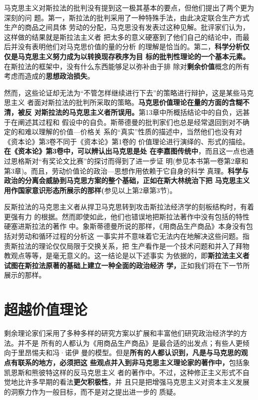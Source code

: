 马克思主义对斯拉法的批判没有提到这一极其基本的要点，但他们提出了两个更为深刻的问
题。第一，斯拉法的批判采用了一种特殊手法，由此决定联合生产方式生产的商品之间具体
劳动的分配，马克思没有发表过这种见解。批评家们认为，这样做的结果就是斯拉法主义者
把太多的意义硬塞到了他们自己的结论中，而最后并没有表明他们对马克思价值的量的分析
的理解是恰当的。第二，\textbf{科学分析仅仅是马克思主义努力成为以转换现存秩序为目
  标的批判性理论的一个基本元素。}在斯拉法的框架中，没有什么东西能够足以弥补由于排
除对\textbf{剩余价值}概念的所有考虑而造成的\textbf{思想政治损失}。

然而，这些论证却无法为“不管怎样继续进行下去”的策略进行辩护，这是某些马克思主义
者面对斯拉法的批判所采取的策略。\textbf{马克思价值理论在量的方面的含糊不清，被反
  对斯拉法的马克思主义者所误用。}第13章中所概括结论中的自负，远甚于在阐述其过程和
假设中的自负。斯蒂德曼的批判家们也总是经常退回到对不确定的和难以理解的价值—价格关
系的“真实”性质的描述中，当然他们也没有对《资本论》第3卷不同于《资本论》第1卷的
价值理论进行演绎的、形式的描绘。\textbf{在《资本论》第3卷中，可以辨认出马克思是处
  在李嘉图传统中}，而且这一点也通过恩格斯对“有奖论文比赛”的探讨而得到了进一步证
明(参见本书第一卷第2章和第3章)。而且，劳动价值论的政治—思想作用依赖于它自身的科学
真理。\textbf{科学与政治的分离会威胁到马克思方案的整个基础，正如在斯大林统治下把
  马克思主义用作国家意识形态所展示的那样(}参见以上第2章第3节)。

反斯拉法的马克思主义者从捍卫马克思转到攻击斯拉法经济学的刻板结构时，有着更强有力
的根据。然而即使如此，他们也错误地把斯拉法著作中没有包括的特性硬塞进斯拉法的著作
中。象斯蒂德曼所说的那样，《用商品生产商品》本身没有包括对劳动和循环过程的分析这
一事实并不意味着它无法内在地解决这些问题。指责斯拉法的理论仅仅局限于交换关系，把
生产看作是一个技术问题和并入了拜物教观点等等，是毫无意义的。这一结论是以下述事实
为依据的，即\textbf{斯拉法主义者试图在斯拉法原著的基础上建立一种全面的政治经济
  学，}正如我们将在下一节所展示的那样。

\section{超越价值理论}

剩余理论家们采用了多种多样的研究方案以扩展和丰富他们研究政治经济学的方法。并不是
所有的人都认为《用商品生产商品》是最合适的出发点；有些人更倾向于里昂惕夫和冯·诺伊
曼的模型。但是\textbf{所有的人都认识到，凡是与马克思的观点有联系的地方，必须把这
  些观点并入到非马克思主义理论家的著作中，}包括象凯恩斯和熊彼特这样的反马克思主义
者的著作中。不过，这种修正主义形式不自觉地比许多早期的看法\textbf{更欠积极性}，并
且只是把增强马克思主义对资本主义发展的洞察力作为一般目标，而不是对之提出进一步的
质疑。

